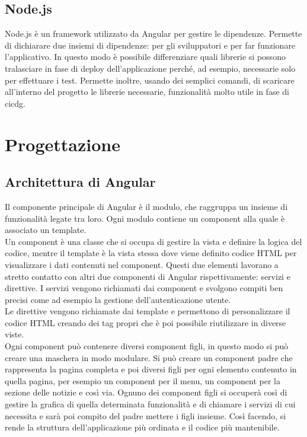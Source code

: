 \subsection*{Node.js}
Node.js è un framework utilizzato da Angular per gestire le dipendenze. Permette
di dichiarare due insiemi di dipendenze: per gli sviluppatori e per far funzionare
l’applicativo. In questo modo è possibile differenziare quali librerie si possono tralasciare in fase di deploy dell’applicazione perché, ad esempio, necessarie solo per effettuare i test. Permette inoltre, usando dei semplici comandi, di scaricare all’interno del progetto le librerie necessarie, funzionalità molto utile in fase di \gls{cicdg}\glsfirstoccur.\cite{site:node}

\section{Progettazione}
\label{sec:progettazione}

\subsection{Architettura di Angular}
Il componente principale di Angular è il modulo, che raggruppa un insieme di funzionalità legate tra loro. Ogni modulo contiene un component alla quale è associato un template.\\
Un component è una classe che si occupa di gestire la vista e definire la logica del codice, mentre il template è la vista stessa dove viene definito codice HTML per visualizzare i dati contenuti nel component. Questi due elementi lavorano a stretto contatto con altri due componenti di Angular rispettivamente: servizi e direttive. I servizi vengono richiamati dai component e svolgono compiti ben precisi come ad esempio la gestione dell’autenticazione utente.\\
Le direttive vengono richiamate dai template e permettono di personalizzare il codice HTML creando dei tag propri che è poi possibile riutilizzare in diverse viste.\\
Ogni component può contenere diversi component figli, in questo modo si può creare una maschera in modo modulare. Si può creare un component padre che rappresenta la pagina completa e poi diversi figli per ogni elemento contenuto in quella pagina, per esempio un component per il menu, un component per la sezione delle notizie e così via. Ognuno dei component figli si occuperà così di gestire la grafica di quella determinata funzionalità e di chiamare i servizi di cui necessita e sarà poi compito del padre mettere i figli insieme. Così facendo, si rende la struttura dell’applicazione più ordinata e il codice più mantenibile.

